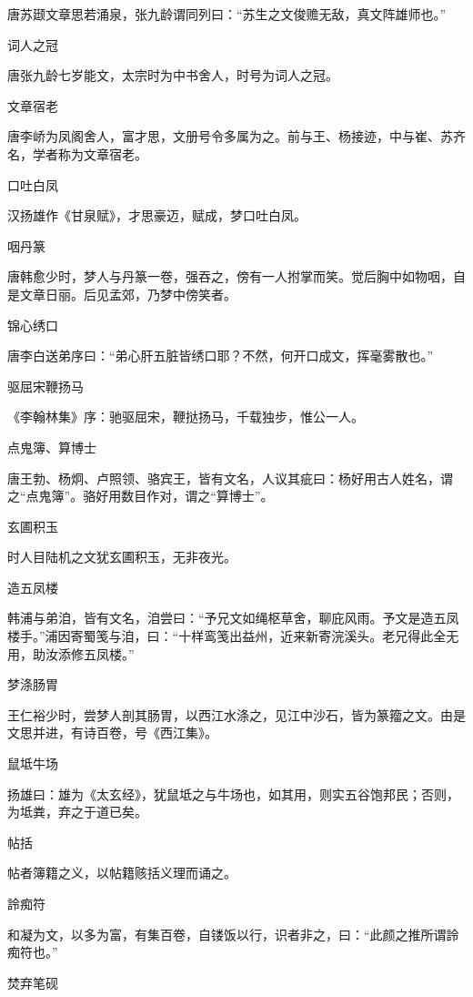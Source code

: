 \documentclass[a4paper,12pt,UTF8,twoside]{ctexbook}
\begin{document}
    唐苏颋文章思若涌泉，张九龄谓同列曰：“苏生之文俊赡无敌，真文阵雄师也。”
    
    词人之冠
    
    唐张九龄七岁能文，太宗时为中书舍人，时号为词人之冠。
    
    文章宿老
    
    唐李峤为凤阁舍人，富才思，文册号令多属为之。前与王、杨接迹，中与崔、苏齐名，学者称为文章宿老。
    
    口吐白凤
    
    汉扬雄作《甘泉赋》，才思豪迈，赋成，梦口吐白凤。
    
    咽丹篆
    
    唐韩愈少时，梦人与丹篆一卷，强吞之，傍有一人拊掌而笑。觉后胸中如物咽，自是文章日丽。后见孟郊，乃梦中傍笑者。
    
    锦心绣口
    
    唐李白送弟序曰：“弟心肝五脏皆绣口耶？不然，何开口成文，挥毫雾散也。”
    
    驱屈宋鞭扬马
    
    《李翰林集》序：驰驱屈宋，鞭挞扬马，千载独步，惟公一人。
    
    点鬼簿、算博士
    
    唐王勃、杨炯、卢照领、骆宾王，皆有文名，人议其疵曰：杨好用古人姓名，谓之“点鬼簿”。骆好用数目作对，谓之“算博士”。
    
    玄圃积玉
    
    时人目陆机之文犹玄圃积玉，无非夜光。
    
    造五凤楼
    
    韩浦与弟洎，皆有文名，洎尝曰：“予兄文如绳枢草舍，聊庇风雨。予文是造五凤楼手。”浦因寄蜀笺与洎，曰：“十样鸾笺出益州，近来新寄浣溪头。老兄得此全无用，助汝添修五凤楼。”
    
    梦涤肠胃
    
    王仁裕少时，尝梦人剖其肠胃，以西江水涤之，见江中沙石，皆为篆籀之文。由是文思并进，有诗百卷，号《西江集》。
    
    鼠坻牛场
    
    扬雄曰：雄为《太玄经》，犹鼠坻之与牛场也，如其用，则实五谷饱邦民；否则，为坻粪，弃之于道已矣。
    
    帖括
    
    帖者簿籍之义，以帖籍赅括义理而诵之。
    
    詅痴符
    
    和凝为文，以多为富，有集百卷，自镂饭以行，识者非之，曰：“此颜之推所谓詅痴符也。”
    
    焚弃笔砚
    
\end{document}
